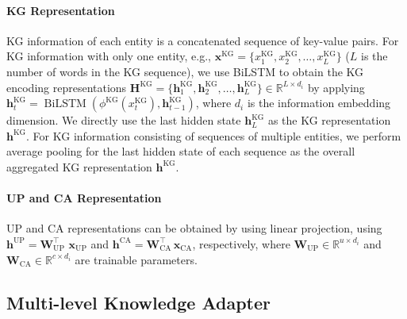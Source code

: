 \documentclass[letterpaper]{article} \usepackage{aaai22}  \usepackage{times}  \usepackage{helvet}  \usepackage{courier}  \usepackage[hyphens]{url}  \usepackage{graphicx} \urlstyle{rm} \def\UrlFont{\rm}  \usepackage{natbib}  \usepackage{caption} \DeclareCaptionStyle{ruled}{labelfont=normalfont,labelsep=colon,strut=off} \frenchspacing  \setlength{\pdfpagewidth}{8.5in}  \setlength{\pdfpageheight}{11in}  \usepackage{algorithm}
\begin{document}
\paragraph{KG Representation}
KG information of each entity is a concatenated sequence of key-value pairs. 
For KG information with only one entity, 
e.g., $\mathbf{x}^{\text{KG}} = \{x^{\text{KG}}_1, x^{\text{KG}}_2, \dots, x^{\text{KG}}_L\}$ ($L$ is the number of words in the KG sequence),
we use BiLSTM to obtain the KG encoding representations $\mathbf{H}^{\text{KG}}=\{\mathbf{h}_{1}^{\text{KG}}, \mathbf{h}_2^{\text{KG}}, \dots, \mathbf{h}_{L}^{\text{KG}}\} \in \mathbb{R}^{L \times d_i}$ by applying $\mathbf{h}_t^{\text{KG}} = \operatorname{BiLSTM}\left(\phi^{\text{KG}}\left(x^{\text{KG}}_{t}\right) , \mathbf{h}_{t-1}^{\text{KG}}\right)$, where $d_i$ is the information embedding dimension.
We directly use the last hidden state $\mathbf{h}_L^{\text{KG}}$ as the KG representation $\mathbf{h}^{\text{KG}}$.
For KG information consisting of sequences of multiple entities, we perform average pooling for the last hidden state of each sequence as the overall aggregated KG representation $\mathbf{h}^{\text{KG}}$.

\paragraph{UP and CA Representation}
UP and CA representations can be obtained by using linear projection, using $\mathbf{h}^{\text{UP}} = \mathbf{W}_\text{UP}^\top \, \, \mathbf{x}_{\text{UP}}$ and $\mathbf{h}^{\text{CA}} = \mathbf{W}_\text{CA}^\top \, \mathbf{x}_{\text{CA}}$, respectively, where $\mathbf{W}_\text{UP} \in \mathbb{R}^{u \times d_i}$ and $\mathbf{W}_\text{CA} \in \mathbb{R}^{c \times d_i}$ are trainable parameters.

\subsection{Multi-level Knowledge Adapter}
\label{sec:knowledge_adapter}
\end{document}
